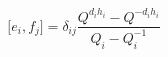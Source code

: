 \begin{equation}
\lbrack e_i,f_j]=\delta _{ij}\frac{Q^{d_ih_i}-Q^{-d_ih_i}}{Q_i-Q_i^{-1}}
\end{equation}

